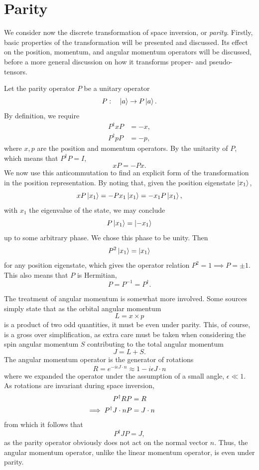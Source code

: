 \section{Parity}
We consider now the discrete transformation of space inversion, or \emph{parity}.
Firstly, basic properties of the transformation will be presented and discussed.
Its effect on the position, momentum, and angular momentum operators will be discussed, before a more general discussion on how it transforms proper- and pseudo-tensors.

Let the parity operator $P$ be a unitary operator
\begin{equation}
  P: \quad \ket{a} \rightarrow P\ket{a}.
\end{equation}
By definition, we require
\begin{align}
  P^\dagger x P &= -x,\\
  P^\dagger p P &= -p,
\end{align}
where $x, p$ are the position and momentum operators.
By the unitarity of $P$, which means that $P^\dagger P = I$,
$$
xP = -Px.
$$
We now use this anticommutation to find an explicit form of the transformation in the position representation.
By noting that, given the position eigenstate $\ket{x_1}$,
\begin{equation}
  x P\ket{x_1} = -P x_1\ket{x_1} = -x_1 P\ket{x_1},
\end{equation}
with $x_1$ the eigenvalue of the state, we may conclude
$$
P\ket{x_1} = \ket{-x_1}
$$
up to some arbitrary phase.
We chose this phase to be unity.
Then
\begin{equation}
  P^2 \ket{x_1} = \ket{x_1}
\end{equation}
for any position eigenstate, which  gives the  operator relation $P^2 = 1 \implies P = \pm 1$.
This also means that $P$ is Hermitian,
$$
P = P^{-1} = P^\dagger.
$$

The treatment of angular momentum is somewhat more involved.
Some sources simply state that as the orbital angular momentum
$$
L = x \times p
$$
is a product of two odd quantities, it must be even under parity.
This, of course, is a gross over simplification, as extra care must be taken when considering the spin angular momentum $S$ contributing to the total angular momentum
$$
J = L + S.
$$
The angular momentum operator is the generator of rotations
$$
R = e^{-i \epsilon J\cdot n} \approx 1 - i \epsilon J \cdot n
$$
where we expanded the operator under the assumption of a small angle, $\epsilon \ll 1$.
As rotations are invariant during space inversion,
\begin{align}
  P^\dagger R P &= R\\
 \mathllap{\implies\;} P^\dagger J \cdot n P &= J\cdot n
\end{align}
from which it follows that
\begin{equation}
P^\dagger J P = J,
\end{equation}
as the parity operator obviously does not act on the normal vector $n$.
Thus, the angular momentum operator, unlike the linear momentum operator, is even under parity.


